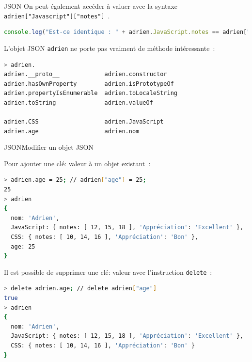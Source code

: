 \documentclass{beamer}
\begin{document}
    \begin{frame}[fragile]{JSON}
        On peut également accéder à valuer avec la syntaxe \lstinline{adrien["Javascript"]["notes"]}~.
        \begin{lstlisting}[language=JavaScript,title={\tiny{Script JavaScript}}]
console.log("Est-ce identique : " + adrien.JavaScript.notes == adrien["Javascript"]["notes"]);
        \end{lstlisting}
        \bigbreak
        L'objet JSON \lstinline{adrien} ne porte pas vraiment de méthode intéressante~:
        \begin{lstlisting}[language=Bash,title={\tiny{Node.js}}]
> adrien.
adrien.__proto__             adrien.constructor
adrien.hasOwnProperty        adrien.isPrototypeOf
adrien.propertyIsEnumerable  adrien.toLocaleString
adrien.toString              adrien.valueOf

adrien.CSS                   adrien.JavaScript
adrien.age                   adrien.nom
        \end{lstlisting}
    \end{frame}

    \begin{frame}[fragile]{JSON}{Modifier un objet JSON}
        \begin{footnotesize}
            Pour ajouter une clé: valeur à un objet existant~:
            \begin{lstlisting}[language=Bash,title={\tiny{Node.js}},basicstyle=\tiny\ttfamily]
> adrien.age = 25; // adrien["age"] = 25;
25
> adrien
{
  nom: 'Adrien',
  JavaScript: { notes: [ 12, 15, 18 ], 'Appréciation': 'Excellent' },
  CSS: { notes: [ 10, 14, 16 ], 'Appréciation': 'Bon' },
  age: 25
}
            \end{lstlisting}
            Il est possible de supprimer une clé: valeur avec l'instruction \lstinline{delete}~:
            \begin{lstlisting}[language=Bash,title={\tiny{Node.js}},basicstyle=\tiny\ttfamily]
> delete adrien.age; // delete adrien["age"]
true
> adrien
{
  nom: 'Adrien',
  JavaScript: { notes: [ 12, 15, 18 ], 'Appréciation': 'Excellent' },
  CSS: { notes: [ 10, 14, 16 ], 'Appréciation': 'Bon' }
}
            \end{lstlisting}
        \end{footnotesize}
    \end{frame}
\end{document}
